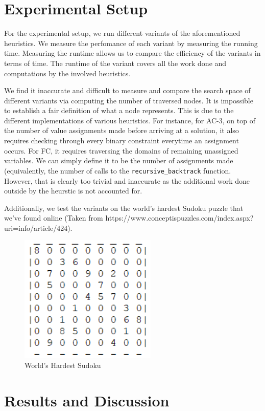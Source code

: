 \documentclass[runningheads]{llncs}
\begin{document}
\section{Experimental Setup}

For the experimental setup, we run different variants of the aforementioned heuristics. We measure the perfomance of each variant by measuring the running time. Measuring the runtime allows us to compare the efficiency of the variants in terms of time. The runtime of the variant covers all the work done and computations by the involved heuristics.

We find it inaccurate and difficult to measure and compare the search space of different variants via computing the number of traversed nodes. It is impossible to establish a fair definition of what a node represents. This is due to the different implementations of various heuristics. For instance, for AC-3, on top of the number of value assignments made before arriving at a solution, it also requires checking through every binary constraint everytime an assignment occurs. For FC,  it requires traversing the domains of remaining unassigned variables. We can simply define it to be the number of assignments made (equivalently, the number of calls to the \verb`recursive_backtrack` function. However, that is clearly too trivial and inaccurate as the additional work done outside by the heurstic is not accounted for. 

Additionally, we test the variants on the world's hardest Sudoku puzzle that we've found online (Taken from https://www.conceptispuzzles.com/index.aspx?uri=info/article/424).

\begin{figure}
\centering
\includegraphics[scale=0.9]{hardest_sudoku.png}
\caption{World's Hardest Sudoku}
\label{Figure 1}
\end{figure}

\section{Results and Discussion}
\end{document}
